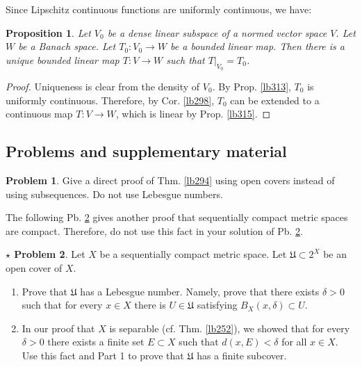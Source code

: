 \documentclass[12pt,b5paper,notitlepage]{article}
\theoremstyle{definition}
\newtheorem{prob}{\color{red}Problem}[section]
\newtheorem{sprob}[prob]{\color{red}$\star$ Problem}
\theoremstyle{plain}
\newtheorem{pp}[df]{Proposition}
\newcommand{\fk}{\mathfrak}
\numberwithin{equation}{section}
\begin{document}
Since Lipschitz continuous functions are uniformly continuous, we have:
\begin{pp}\label{lb500}
Let $V_0$ be a dense linear subspace of a normed vector space $V$. Let $W$ be a Banach space. Let $T_0:V_0\rightarrow W$ be a bounded linear map. Then there is a unique bounded linear map $T:V\rightarrow W$ such that $T|_{V_0}=T_0$.
\end{pp}

\begin{proof}
Uniqueness is clear from the density of $V_0$. By Prop. \ref{lb313}, $T_0$ is uniformly continuous. Therefore, by Cor. \ref{lb298}, $T_0$ can be extended to a continuous map $T:V\rightarrow W$, which is linear by Prop. \ref{lb315}.
\end{proof}











\subsection{Problems and supplementary material}

\begin{prob}
Give a direct proof of Thm. \ref{lb294} using open covers instead of using subsequences. Do not use Lebesgue numbers.
\end{prob}


The following Pb. \ref{lb296} gives another proof that sequentially compact metric spaces are compact. Therefore, do not use this fact in your solution of Pb. \ref{lb296}.

\begin{sprob}\label{lb296}
Let $X$ be a sequentially compact metric space. Let $\fk U\subset 2^X$ be an open cover of $X$.
\begin{enumerate}
\item Prove that $\fk U$ has a Lebesgue number. Namely, prove that there exists $\delta>0$ such that for every $x\in X$ there is $U\in\fk U$ satisfying $B_X(x,\delta)\subset U$.
\item In our proof that $X$ is separable (cf. Thm. \ref{lb252}), we showed that for every $\delta>0$ there exists a finite set $E\subset X$ such that $d(x,E)<\delta$ for all $x\in X$. Use this fact and Part 1 to prove that $\fk U$ has a finite subcover.
\end{enumerate}
\end{sprob}
\end{document}

